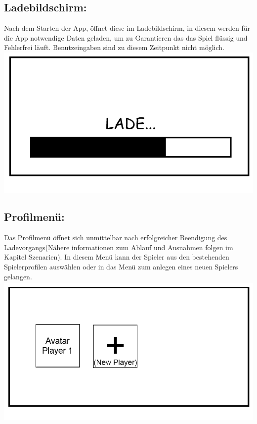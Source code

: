 \documentclass{scrartcl}
\begin{document}
\begin{enumerate}
	\begin{minipage}{1\textwidth}
		\item \subsection*{Ladebildschirm:}
		Nach dem Starten der App, öffnet diese im Ladebildschirm, in diesem werden für die App notwendige Daten geladen, um zu Garantieren das das Spiel flüssig und Fehlerfrei läuft. Benutzeingaben sind zu diesem Zeitpunkt nicht möglich.\\
		\includegraphics[width=\textwidth, height=7.5cm]{assets/LoadScreen}
	\end{minipage}
	
	\begin{minipage}{1\textwidth}
		\item \subsection*{Profilmenü:}
		Das Profilmenü öffnet sich unmittelbar nach erfolgreicher Beendigung des Ladevorgangs(Nähere informationen zum Ablauf und Ausnahmen folgen im Kapitel Szenarien).
		In diesem Menü kann der Spieler aus den bestehenden Spielerprofilen auswählen oder in das Menü zum anlegen eines neuen Spielers gelangen.\\
		\includegraphics[width=\textwidth, height=7.5cm]{assets/PlayerScreen}
	\end{minipage}
	

\end{enumerate}
\end{document}

